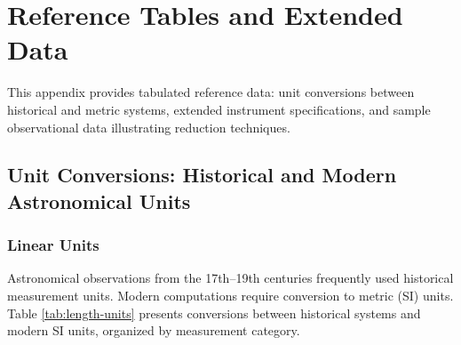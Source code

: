 \chapter{Reference Tables and Extended Data}
\label{app:reference-tables}

This appendix provides tabulated reference data: unit conversions between historical and metric systems, extended instrument specifications, and sample observational data illustrating reduction techniques.

\section{Unit Conversions: Historical and Modern Astronomical Units}

\subsection{Linear Units}

Astronomical observations from the 17th--19th centuries frequently used historical measurement units. Modern computations require conversion to metric (SI) units. Table \ref{tab:length-units} presents conversions between historical systems and modern SI units, organized by measurement category.

\clearpage

